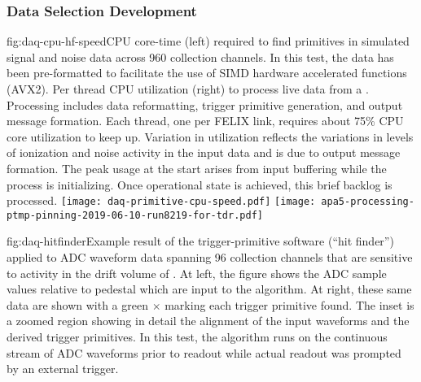 \subsubsection{Data Selection Development}

\begin{dunefigure}{fig:daq-cpu-hf-speed}{CPU core-time (left) required to find primitives in simulated signal and noise data across 960 collection channels.
    In this test, the data has been pre-formatted to facilitate the use of SIMD hardware accelerated functions (AVX2). 
    Per thread CPU utilization (right) to process live data from a  .
    Processing includes data reformatting, trigger primitive generation, and output message formation.
    Each thread, one per FELIX link, requires about 75\% CPU core utilization to keep up.
    Variation in utilization reflects the variations in levels of ionization and noise activity in the input data and is due to output message formation.
    The peak usage at the start arises from input buffering while the process is initializing. 
    Once operational state is achieved, this brief backlog is processed.}
  \texttt{[image: daq-primitive-cpu-speed.pdf]}%
  \texttt{[image: apa5-processing-ptmp-pinning-2019-06-10-run8219-for-tdr.pdf]}
\end{dunefigure}

\begin{dunefigure}{fig:daq-hitfinder}{Example result of the trigger-primitive software (``hit finder'') applied to ADC waveform data spanning 96 collection channels that are sensitive to activity in the drift volume of . 
    At left, the figure shows the ADC sample values relative to pedestal which are input to the algorithm. 
    At right, these same data are shown with a green $\times$ marking each trigger primitive found. 
    The inset is a zoomed region showing in detail the alignment of the input waveforms and the derived trigger primitives.
    In this test, the algorithm runs on the continuous stream of ADC waveforms prior to readout while actual readout was prompted by an external trigger.}
\end{dunefigure}

